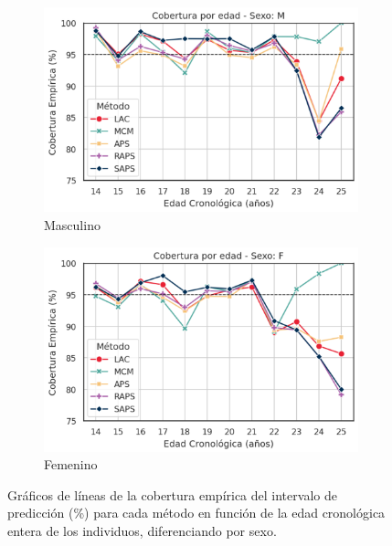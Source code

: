 \begin{figure}[h]
    \centering
    
    \begin{subfigure}[b]{0.49\textwidth}
        \centering
        \includegraphics[width=\textwidth]{capitulos/cap_05/imagenes/AGC_EC_by_true_age_Male.png}
        \caption{Masculino}
        \label{fig:AGC_EC_by_true_age_M}
    \end{subfigure}
    \hfill
    \begin{subfigure}[b]{0.49\textwidth}
        \centering
        \includegraphics[width=\textwidth]{capitulos/cap_05/imagenes/AGC_EC_by_true_age_Female.png}
        \caption{Femenino}
        \label{fig:AGC_EC_by_true_age_F}
    \end{subfigure}

    \caption[
        Problema de clasificación de edad: 
        Gráficos de líneas de la cobertura empírica del intervalo de predicción (\%) para cada método en función de la edad cronológica entera de los individuos, diferenciando por sexo.
    ]{
        Gráficos de líneas de la cobertura empírica del intervalo de predicción (\%) para cada método en función de la edad cronológica entera de los individuos, diferenciando por sexo. 
    }
    \label{fig:AGC_EC_by_true_age}
\end{figure}

